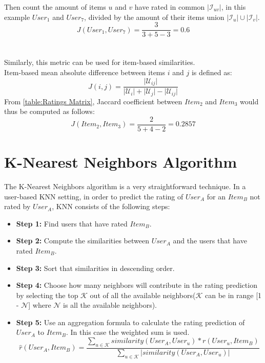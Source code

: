 Then count the amount of items $u$ and $v$ have rated in common $\mathopen|\mathcal{I}_{uv}\mathclose|$, in this example $User_1$ and $User_7$,
divided by the amount of their items union $\mathopen|\mathcal{I}_u\mathclose| \cup \mathopen|\mathcal{I}_v\mathclose|$.
$$J(User_1,User_7) = \frac{3}{3 + 5 - 3} = 0.6$$\\\\
Similarly, this metric can be used for item-based similarities.\\
Item-based mean absolute difference between items $i$ and $j$ is defined as:
\begin{equation}
J(i,j) = \frac{\mathopen|\mathcal{U}_{ij}\mathclose|}
		  {\mathopen|\mathcal{U}_{i}\mathclose| +
   \mathopen|\mathcal{U}_{j}\mathclose| -
   \mathopen|\mathcal{U}_{ij}\mathclose|}
\end{equation}
From \autoref{table:Ratings Matrix}, Jaccard coefficient
between $Item_2$ and $Item_3$ would thus be computed as follows:
$$J(Item_2,Item_3) = \frac{2}{5 + 4 - 2} = 0.2857$$
\section{K-Nearest Neighbors Algorithm}\label{sec:2.3}
The K-Nearest Neighbors algorithm is a very straightforward technique.
In a user-based KNN setting, in order to predict the rating of $User_A$ for an
$Item_B$ not rated by $User_A$, KNN consists of the following steps:
\begin{itemize}
	\item[] \textbf{Step 1:} Find users that have rated $Item_B$.
	\item[] \textbf{Step 2:} Compute the similarities between $User_A$ and the users that have
	rated $Item_B$.
	\item[] \textbf{Step 3:}  Sort that similarities in descending order.
	\item[] \textbf{Step 4:}  Choose how many neighbors will contribute in the rating
	prediction by selecting the top $\mathcal{K}$ out of all the available
	neighbors($\mathcal{K}$ can be in range [1 - $\mathcal{N}$] where $\mathcal{N}$ is all
	the available neighbors).
	\item[] \textbf{Step 5:} Use an aggregation formula to calculate the rating prediction of
	$User_A$ to $Item_B$. In this case the weighted sum \citep{sarwar2001item} is used.
\begin{equation}\label{nearest_neighbors}
	\hat{r}(User_A,Item_B) = \frac{\sum_{u \in \mathcal{K}}{similarity(User_A,User_u) * r(User_u,Item_B)}}
						    {\sum_{u \in \mathcal{K}}{\mathopen|similarity(User_A,User_u)\mathclose|}}
\end{equation}
\end{itemize}

